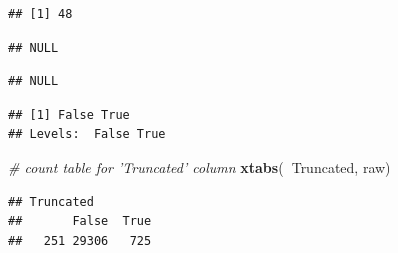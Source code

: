 \documentclass[]{book}
\newenvironment{Shaded}{\begin{snugshade}}{\end{snugshade}}
\newcommand{\CommentTok}[1]{\textcolor[rgb]{0.56,0.35,0.01}{\textit{#1}}}
\newcommand{\KeywordTok}[1]{\textcolor[rgb]{0.13,0.29,0.53}{\textbf{#1}}}
\newcommand{\NormalTok}[1]{#1}
\newcommand{\OperatorTok}[1]{\textcolor[rgb]{0.81,0.36,0.00}{\textbf{#1}}}
\newcommand{\StringTok}[1]{\textcolor[rgb]{0.31,0.60,0.02}{#1}}
\begin{document}
\begin{verbatim}
## [1] 48
\end{verbatim}

\begin{Shaded}
\end{Shaded}

\begin{verbatim}
## NULL
\end{verbatim}

\begin{Shaded}
\end{Shaded}

\begin{verbatim}
## NULL
\end{verbatim}

\begin{Shaded}
\end{Shaded}

\begin{verbatim}
## [1] False True       
## Levels:  False True
\end{verbatim}

\begin{Shaded}
\begin{Highlighting}[]
\CommentTok{# count table for 'Truncated' column}
\KeywordTok{xtabs}\NormalTok{(}\OperatorTok{~}\NormalTok{Truncated, raw)}
\end{Highlighting}
\end{Shaded}

\begin{verbatim}
## Truncated
##       False  True 
##   251 29306   725
\end{verbatim}

\begin{Shaded}
\end{Shaded}
\end{document}
